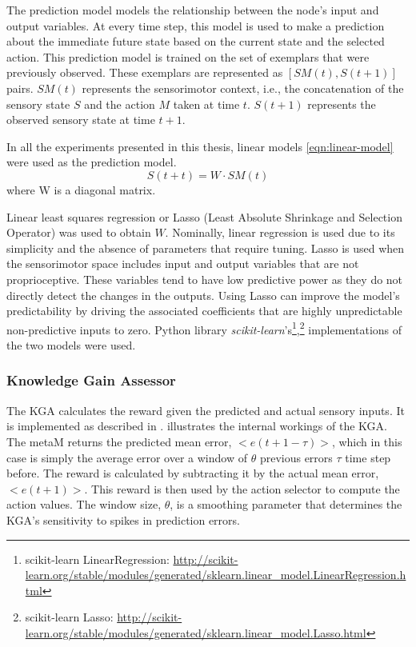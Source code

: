 The prediction model models the relationship between the node's input and output variables. At every time step, this model is used to make a prediction about the immediate future state based on the current state and the selected action. This prediction model is trained on the set of exemplars that were previously observed. These exemplars are represented as $[SM(t),S(t+1)]$ pairs. $SM(t)$ represents the sensorimotor context, i.e., the concatenation of the sensory state $S$ and the action $M$ taken at time $t$. $S(t+1)$ represents the observed sensory state at time $t+1$. 

In all the experiments presented in this thesis, linear models \eqref{eqn:linear-model} were used as the prediction model.
\begin{equation}\label{eqn:linear-model}
	S(t+t) = W \cdot SM(t)
\end{equation}
where W is a diagonal matrix.

Linear least squares regression or Lasso (Least Absolute Shrinkage and Selection Operator) \cite{Tibshirani1996} was used to obtain $W$. Nominally, linear regression is used due to its simplicity and the absence of parameters that require tuning. Lasso is used when the sensorimotor space includes input and output variables that are not proprioceptive. These variables tend to have low predictive power as they do not directly detect the changes in the outputs. Using Lasso can improve the model's predictability by driving the associated coefficients that are highly unpredictable non-predictive inputs to zero. Python library \textit{scikit-learn}'s\footnote{scikit-learn LinearRegression: \url{http://scikit-learn.org/stable/modules/generated/sklearn.linear_model.LinearRegression.html}},\footnote{scikit-learn Lasso: \url{http://scikit-learn.org/stable/modules/generated/sklearn.linear_model.Lasso.html}} implementations of the two models were used. 

\subsubsection{Knowledge Gain Assessor}

The KGA calculates the reward given the predicted and actual sensory inputs. It is implemented as described in \cite{Oudeyer2007}.  illustrates the internal workings of the KGA. The metaM returns the predicted mean error, $<e(t+1-\tau)>$, which in this case is simply the average error over a window of $\theta$ previous errors $\tau$ time step before. The reward is calculated by subtracting it by the actual mean error, $<e(t+1)>$. This reward is then used by the action selector to compute the action values. The window size, $\theta$, is a smoothing parameter that determines the KGA's sensitivity to spikes in prediction errors. 

